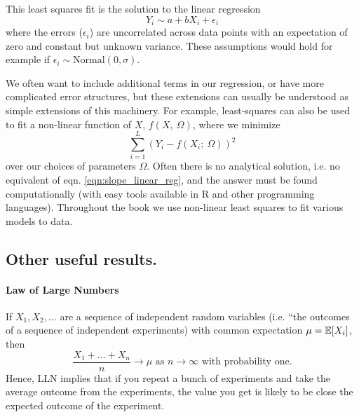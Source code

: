 This least squares fit is the solution to the linear regression
\begin{equation}
Y_i \sim a+ b X_i + \epsilon_i
\end{equation}
where the errors ($\epsilon_i$) are uncorrelated across data points
with an expectation of zero and constant but unknown variance. These
assumptions would hold for example if $\epsilon_i \sim \textrm{Normal}(0,\sigma)$.


We often want to include additional terms in our regression, or have
more complicated error structures, but these
extensions can usually be understood as simple extensions of this
machinery. For example, least-squares can also be used to fit a non-linear
function of $X$, $f(X,~\Omega)$, 
where we minimize 
\begin{equation}
\sum_{i=1}^L  (Y_i  -f(X_i; ~\Omega ))^2
\end{equation}
over our choices of parameters $\Omega$. Often there is no analytical
solution, i.e. no equivalent of eqn. \ref{eqn:slope_linear_reg}, and
the answer must be found computationally (with easy tools available in
R and other programming languages). Throughout the book we use
non-linear least squares to fit various models to data. 


\subsection*{Other useful results.}
\paragraph{Law of Large Numbers} If $X_1,X_2,\dots$ are a sequence of independent random variables (i.e. ``the outcomes of a sequence of independent experiments) with common expectation $\mu= \mathbb{E}[X_i]$, then 
\begin{equation}
\frac{X_1+\dots +X_n}{n} \to \mu \mbox{ as }n\to \infty \mbox{ with
  probability one.}
\end{equation}
Hence, LLN implies that if you repeat a bunch of experiments and take the average outcome from the experiments, the value you get is likely to be close the expected outcome of the experiment. 

